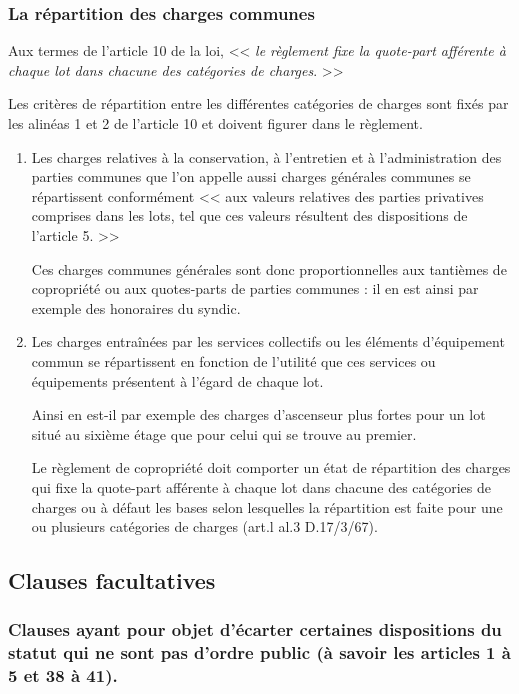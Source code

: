 		\subsubsection{La répartition des charges communes}
		
			Aux termes de l'article 10 de la loi,
			<< {\itshape le règlement fixe la quote-part afférente à chaque lot dans chacune des catégories de charges}. >>
			
			Les critères de répartition entre les différentes catégories de charges sont fixés par les alinéas 1 et 2 de l'article 10 et doivent figurer dans le règlement.
			
			\begin{enumerate}[label=alpha*)]
				\item Les charges relatives à la conservation, à l'entretien et à l'administration des parties communes que l'on appelle aussi charges générales communes se répartissent conformément << aux valeurs relatives des parties privatives comprises dans les lots, tel que ces valeurs résultent des dispositions de l'article 5. >>
				
				Ces charges communes générales sont donc proportionnelles aux tantièmes de copropriété ou aux quotes-parts de parties communes : il en est ainsi par exemple des honoraires du syndic.
	
				\item Les charges entraînées par les services collectifs ou les éléments d'équipement commun se répartissent en fonction de l'utilité que ces services ou équipements présentent à l'égard de chaque lot.
				
				Ainsi en est-il par exemple des charges d'ascenseur plus fortes pour un lot situé au sixième étage que pour celui qui se trouve au premier.
				
				Le règlement de copropriété doit comporter un état de répartition des charges qui fixe la quote-part afférente à chaque lot dans chacune des catégories de charges ou à défaut les bases selon lesquelles la répartition est faite pour une ou plusieurs catégories de charges (art.l al.3 D.17/3/67).
			\end{enumerate}
	
	\subsection{Clauses facultatives}
	
		\subsubsection{Clauses ayant pour objet d’écarter certaines dispositions du statut qui ne sont pas d’ordre public (à savoir les articles 1 à 5 et 38 à 41).}
		
